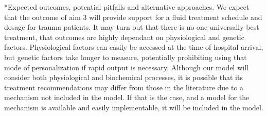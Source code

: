 \documentclass[11pt]{article}
\makeatletter
\renewcommand\paragraph{\@startsection
  {paragraph}{2}{0mm}
  {-0.05in}
  {-0.5\baselineskip}
  {\normalfont\normalsize\itshape}}
\makeatother
\begin{document}
\paragraph*{Expected outcomes, potential pitfalls and alternative approaches.}
We expect that the outcome of aim 3 will provide support for a fluid treatment schedule and dosage for trauma patients. It may turn out that there is no one universally best treatment, that outcomes are highly dependant on physiological and genetic factors. Physiological factors can easily be accessed at the time of hospital arrival, but genetic factors take longer to measure, potentially prohibiting using that mode of personalization if rapid output is necessary. Although our model will consider both physiological and biochemical processes, it is possible that its treatment recommendations may differ from those in the literature due to a mechanism not included in the model. If that is the case, and a model for the mechanism is available and easily implementable, it will be included in the model. 
\end{document}

